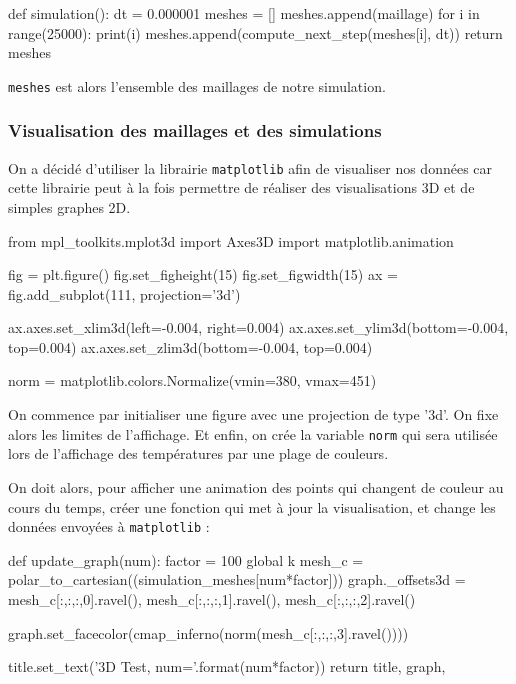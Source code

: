 \documentclass[fleqn]{article}
\begin{document}
\begin{python}
    def simulation():
    dt = 0.000001
    meshes = []
    meshes.append(maillage)
    for i in range(25000):
        print(i)
        meshes.append(compute_next_step(meshes[i], dt))
    return meshes
\end{python}

\texttt{meshes} est alors l'ensemble des maillages de notre simulation.

\subsubsection{Visualisation des maillages et des simulations}
On a décidé d'utiliser la librairie \texttt{matplotlib} afin de visualiser nos données car cette librairie peut à la fois permettre de réaliser des visualisations 3D et de simples graphes 2D.

\begin{python}
    from mpl_toolkits.mplot3d import Axes3D
    import matplotlib.animation

    fig = plt.figure()
    fig.set_figheight(15)
    fig.set_figwidth(15)
    ax = fig.add_subplot(111, projection='3d')

    ax.axes.set_xlim3d(left=-0.004, right=0.004) 
    ax.axes.set_ylim3d(bottom=-0.004, top=0.004)
    ax.axes.set_zlim3d(bottom=-0.004, top=0.004)

    norm = matplotlib.colors.Normalize(vmin=380, vmax=451)
\end{python}

On commence par initialiser une figure avec une projection de type '3d'. On fixe alors les limites de l'affichage. Et enfin, on crée la variable \texttt{norm} qui sera utilisée lors de l'affichage des températures par une plage de couleurs.

On doit alors, pour afficher une animation des points qui changent de couleur au cours du temps, créer une fonction qui met à jour la visualisation, et change les données envoyées à \texttt{matplotlib} :
\begin{python}
    def update_graph(num):
        factor = 100
        global k
        mesh_c = polar_to_cartesian((simulation_meshes[num*factor]))
        graph._offsets3d = mesh_c[:,:,:,0].ravel(), mesh_c[:,:,:,1].ravel(), mesh_c[:,:,:,2].ravel()
        
        graph.set_facecolor(cmap_inferno(norm(mesh_c[:,:,:,3].ravel())))
            
        title.set_text('3D Test, num={}'.format(num*factor))
        return title, graph, 
\end{python}
\end{document}
